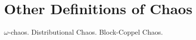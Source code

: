 \documentclass[12pt,twoside,draft]{book}
\begin{document}
\chapter{Other Definitions of Chaos}
$\omega$-chaos\citep{omegachaos}.
Distributional Chaos\citep{dchaos1}\citep{dchaos2}.
Block-Coppel Chaos\citep{blockcoppel}\citep{aulbach}.




\printindex
\end{document}
